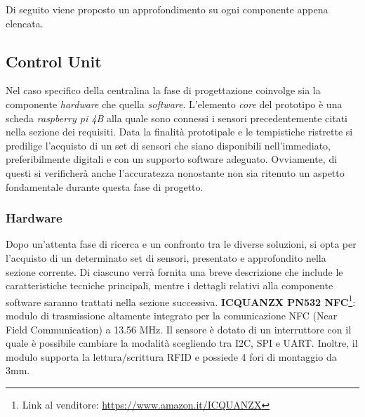 Di seguito viene proposto un approfondimento su ogni componente appena elencata.

\subsection{Control Unit}
Nel caso specifico della centralina la fase di progettazione coinvolge sia la componente \textit{hardware} che quella \textit{software}. L'elemento \textit{core} del prototipo è una scheda \textit{raspberry pi 4B} alla quale sono connessi i sensori precedentemente citati nella sezione dei requisiti. Data la finalità prototipale e le tempistiche ristrette si predilige l'acquisto di un set di sensori che siano disponibili nell'immediato, preferibilmente digitali e con un supporto software adeguato. Ovviamente, di questi si verificherà anche l'accuratezza nonostante non sia ritenuto un aspetto fondamentale durante questa fase di progetto. 

\subsubsection{Hardware}
Dopo un'attenta fase di ricerca e un confronto tra le diverse soluzioni, si opta per l'acquisto di un determinato set di sensori, presentato e approfondito nella sezione corrente. Di ciascuno verrà fornita una breve descrizione che include le caratteristiche tecniche principali, mentre i dettagli relativi alla componente software saranno trattati nella sezione successiva.\newline\newline
%
\textbf{ICQUANZX PN532 NFC}\footnote{Link al venditore: \href{https://www.amazon.it/ICQUANZX-Communication-Arduino-Raspberry-Android/dp/B07VT431QZ/}{https://www.amazon.it/ICQUANZX}}: modulo di trasmissione altamente integrato per la comunicazione NFC (Near Field Communication) a 13.56 MHz. Il sensore è dotato di un interruttore con il quale è possibile cambiare la modalità scegliendo tra I2C, SPI e UART. Inoltre, il modulo supporta la lettura/scrittura RFID e possiede 4 fori di montaggio da 3mm. 
    
